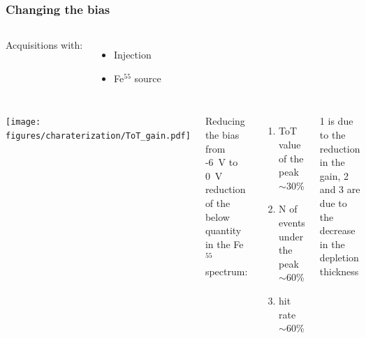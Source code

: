     \begin{frame}
        \frametitle{Changing the bias}
        \begin{columns}
                Acquisitions with:
                \begin{itemize}
                    \item Injection
                    \item Fe$^{55}$ source
                \end{itemize}
                \begin{table}
                    \begin{center}
                    \end{center}
                \end{table}
        \end{columns}
        \begin{columns}
            \medskip        
            \texttt{[image: figures/charaterization/ToT\_gain.pdf]}

            Reducing the bias from -\SI{6}{V} to \SI{0}{V} reduction of the below quantity in the Fe$^{55}$ spectrum: 
            \begin{enumerate}
                \item ToT value of the peak $\sim$30\%
                \item N of events under the peak $\sim$60\%
                \item hit rate $\sim$60\%
            \end{enumerate}
            1 is due to the reduction in the gain, 2 and 3 are due to the decrease in the depletion thickness
        \end{columns}
    \end{frame}      




